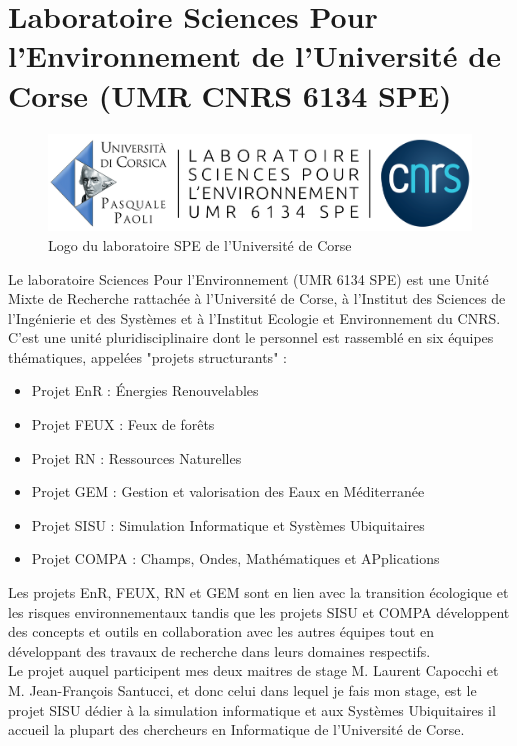 \documentclass{rapport_stage}
\begin{document}
\section*{Laboratoire Sciences Pour l'Environnement de l'Université de Corse (UMR CNRS 6134 SPE)}

\begin{figure}[ht]
  \centering
  \includegraphics[width=15cm]{figures/logo_SPE.png}
  \caption{Logo du laboratoire SPE de l'Université de Corse}
  \label{fig:logo-SPE}
\end{figure}


Le laboratoire Sciences Pour l'Environnement (UMR 6134 SPE) est une Unité Mixte de Recherche
rattachée à l'Université de Corse, à l'Institut des Sciences de l'Ingénierie et des Systèmes et à
l'Institut Ecologie et Environnement du CNRS. C'est une unité pluridisciplinaire dont le personnel
est rassemblé en six équipes thématiques, appelées "projets structurants"\cite{santoni_presentation_2022} :

\begin{itemize}
  \item Projet EnR : Énergies Renouvelables
  \item Projet FEUX : Feux de forêts
  \item Projet RN : Ressources Naturelles
  \item Projet GEM : Gestion et valorisation des Eaux en Méditerranée
  \item Projet SISU : Simulation Informatique et Systèmes Ubiquitaires
  \item Projet COMPA : Champs, Ondes, Mathématiques et APplications
\end{itemize}

Les projets EnR, FEUX, RN et GEM sont en lien avec la transition écologique et les risques
environnementaux tandis que les projets SISU et COMPA développent des concepts et outils
en collaboration avec les autres équipes tout en développant des travaux de recherche dans leurs
domaines respectifs. \\


Le projet auquel participent mes deux maitres de stage M. Laurent Capocchi et M. Jean-François
Santucci, et donc celui dans lequel je fais mon stage, est le projet SISU dédier à la simulation
informatique et aux Systèmes Ubiquitaires il accueil la plupart des chercheurs en Informatique de
l'Université de Corse.
\end{document}
